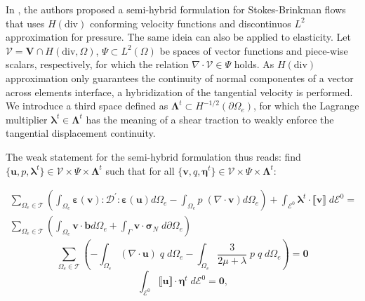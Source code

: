 \documentclass[english,11pt,3p,number,sort&compress]{elsarticle}
\begin{document}
In \cite{carvalho2024semi}, the authors proposed a semi-hybrid formulation for Stokes-Brinkman flows that uses $H(\text{div})$ conforming velocity functions and discontinuos $L^2$ approximation for pressure. The same ideia can also be applied to elasticity. Let $\mathcal{V} = \mathbf{V}\cap H(\text{div},\Omega)$, $\Psi \subset L^2(\Omega)$ be spaces of vector functions and piece-wise scalars, respectively, for which the relation $\nabla \cdot \mathcal{V} \in \Psi$ holds. As $H(\text{div})$ approximation only guarantees the continuity of normal componentes of a vector across elements interface, a hybridization of the tangential velocity is performed. We introduce a third space defined as $\boldsymbol{\Lambda}^t \subset H^{-1/2}(\partial\Omega_e)$, for which the Lagrange multiplier $\boldsymbol{\lambda}^t \in \boldsymbol{\Lambda}^t$ has the meaning of a shear traction to weakly enforce the tangential displacement continuity. 

The weak statement for the semi-hybrid formulation thus reads: find $\{\mathbf{u},p,\boldsymbol{\lambda}^t\} \in \mathcal{V} \times \Psi \times \boldsymbol{\Lambda}^t$ such that for all $\{\mathbf{v},q,\boldsymbol{\eta}^t\} \in \mathcal{V}\times \Psi \times \boldsymbol{\Lambda}^t$:

\begin{equation} \label{eq:semihybrid1}
    \begin{split}
        \sum_{\Omega_e \in \mathcal{T}} \left( \int_{\Omega_e} \boldsymbol{\varepsilon}(\mathbf{v}) : \mathcal{D}^{'} : \boldsymbol{\varepsilon}(\mathbf{u}) d\Omega_e - \int_{\Omega_e} p\; (\nabla \cdot \mathbf{v}) d\Omega_e \right) + \int_{\mathcal{E}^0} \boldsymbol{\lambda}^t \cdot \llbracket \mathbf{v} \rrbracket \;d\mathcal{E}^0 = \\ \sum_{\Omega_e \in \mathcal{T}} \left( \int_{\Omega_e} \mathbf{v} \cdot \mathbf{b} d\Omega_e + \int_{\Gamma} \mathbf{v} \cdot \boldsymbol{\sigma}_N \; d\partial\Omega_e \right)
    \end{split}
\end{equation}
\begin{equation} \label{eq:semihybrid2}
    \sum_{\Omega_e \in \mathcal{T}} \left(-\int_{\Omega_e} (\nabla \cdot \mathbf{u}) \;q\; d\Omega_e -\int_{\Omega_e} \frac{3}{2\mu+\lambda}\;p\; q\; d\Omega_e \right) = \mathbf{0}
\end{equation}
\begin{equation} \label{eq:semihybrid3}
    \int_{\mathcal{E}^0} \llbracket \mathbf{u} \rrbracket \cdot \mathbf{\eta}^t \;d\mathcal{E}^0 = \mathbf{0} \text{,}
\end{equation}
\end{document}
